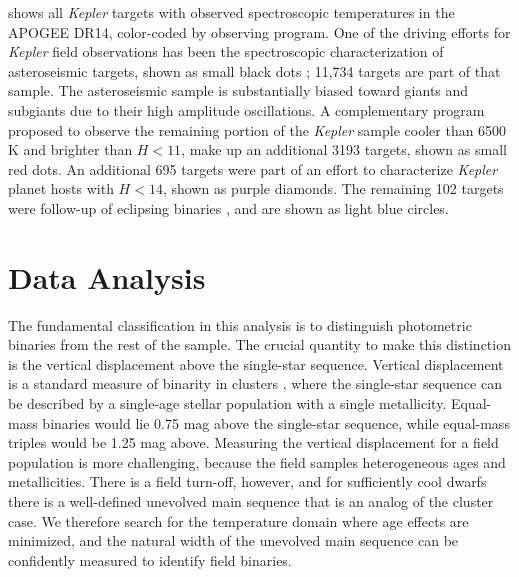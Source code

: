 \documentclass[manuscript]{aastex6}
\newcommand{\Kepler}{\mbox{\textit{Kepler}}}
\newcommand{\Teff}{\ensuremath{T_{eff}}}
\begin{document}
\begin{figure*}[htb]
    \centering
    \caption{\emph{Left:} \Teff-\(M_K\) diagram for the APOGEE observations of
        \Kepler{} targets. Asteroseismic targets are shown as black dots. The
        dwarf sample is shown as brown dots. The light blue dots indicate 
        eclipsing binary targets and purple dots are Kepler Objects of 
        Interest. A binary sequence is clearly visible on the lower main
        sequence. Temperatures are spectrosopic APOGEE temperatures. A 
        representative error bar for the cool dwarf sample is 
        shown in the bottom-right corner. \emph{Right:} A density plot of the 
        full APOGEE sample. To preserve the dynamic range of the dwarf 
        sequence, the red clump was allowed to saturate. The bin size is 100 K
    horizontally and 0.02 mag vertically.}\label{fig:apogee_selection}
\end{figure*}

 shows all \Kepler{} targets with observed
spectroscopic temperatures in the APOGEE DR14, color-coded by observing
program. One of the driving efforts for \Kepler{} field observations has been
the spectroscopic characterization of asteroseismic targets, shown as small
black dots \citep{Zasowski17,Pinsonneault18}; 11,734 targets are part of that
sample. The asteroseismic sample is substantially biased toward giants 
and subgiants due to their high amplitude oscillations. A complementary 
program proposed to observe the remaining portion of the \Kepler{} sample 
cooler than 6500 K and brighter than \(H < 11\), make up an additional 3193
targets, shown as small red dots. An additional 695 targets were part of an 
effort to characterize \Kepler{} planet hosts with \(H < 14\), shown as purple 
diamonds. The remaining 102 targets were follow-up of eclipsing binaries 
\citep{Prsa11,Slawson11}, and are shown as light blue circles.  

\section{Data Analysis}
\label{sec:analysis}

The fundamental classification in this analysis is to distinguish photometric
binaries from the rest of the sample. The crucial quantity to make this
distinction is the 
vertical displacement above the single-star sequence. Vertical 
displacement is a standard measure of binarity in clusters 
\citep{Mermilliod92}, where the single-star sequence can be described by a
single-age stellar population with a single metallicity. Equal-mass binaries
would lie 0.75 mag above the single-star sequence, while equal-mass triples would be
1.25 mag above. Measuring the vertical displacement for a field population is 
more challenging, because the
field samples heterogeneous ages and metallicities. There is a
field turn-off, however, and for sufficiently cool dwarfs there is a
well-defined unevolved main sequence that is an analog of the cluster case. We
therefore search for the temperature domain where age effects are minimized, 
and the natural width of the unevolved main sequence can be confidently
measured to identify field binaries.
\end{document}
